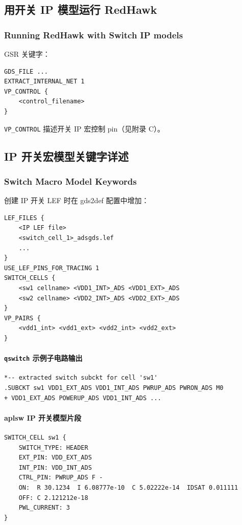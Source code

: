 \subsection{用开关 IP 模型运行 RedHawk}
\subsubsection*{Running RedHawk with Switch IP models}

GSR 关键字：
\begin{lstlisting}
GDS_FILE ...
EXTRACT_INTERNAL_NET 1
VP_CONTROL {
    <control_filename>
}
\end{lstlisting}
\texttt{VP\_CONTROL} 描述开关 IP 宏控制 pin（见附录 C）。
\subsection{IP 开关宏模型关键字详述}
\subsubsection*{Switch Macro Model Keywords}

创建 IP 开关 LEF 时在 gds2def 配置中增加：
\begin{lstlisting}
LEF_FILES {
    <IP LEF file>
    <switch_cell_1>_adsgds.lef
    ...
}
USE_LEF_PINS_FOR_TRACING 1
SWITCH_CELLS {
    <sw1 cellname> <VDD1_INT>_ADS <VDD1_EXT>_ADS
    <sw2 cellname> <VDD2_INT>_ADS <VDD2_EXT>_ADS
}
VP_PAIRS {
    <vdd1_int> <vdd1_ext> <vdd2_int> <vdd2_ext>
}
\end{lstlisting}

\paragraph{\texttt{qswitch} 示例子电路输出}
\begin{lstlisting}
*-- extracted switch subckt for cell 'sw1'
.SUBCKT sw1 VDD1_EXT_ADS VDD1_INT_ADS PWRUP_ADS PWRON_ADS M0
+ VDD1_EXT_ADS POWERUP_ADS VDD1_INT_ADS ...
\end{lstlisting}

\paragraph{aplsw IP 开关模型片段}
\begin{lstlisting}
SWITCH_CELL sw1 {
    SWITCH_TYPE: HEADER
    EXT_PIN: VDD_EXT_ADS
    INT_PIN: VDD_INT_ADS
    CTRL_PIN: PWRUP_ADS F -
    ON:  R 30.1234  I 6.08777e-10  C 5.02222e-14  IDSAT 0.011111
    OFF: C 2.121212e-18
    PWL_CURRENT: 3
}
\end{lstlisting}

